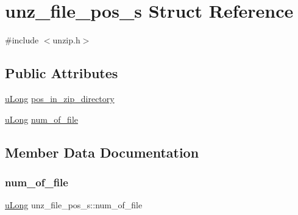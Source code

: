 \hypertarget{structunz__file__pos__s}{}\section{unz\+\_\+file\+\_\+pos\+\_\+s Struct Reference}
\label{structunz__file__pos__s}


{\ttfamily \#include $<$unzip.\+h$>$}

\subsection*{Public Attributes}
\begin{DoxyCompactItemize}
\item 
\hyperlink{ioapi_8h_a50e9e9d5c30e481de822ad68fe537986}{u\+Long} \hyperlink{structunz__file__pos__s_a87d193346d3825363f899f574a2f3cb2}{pos\+\_\+in\+\_\+zip\+\_\+directory}
\item 
\hyperlink{ioapi_8h_a50e9e9d5c30e481de822ad68fe537986}{u\+Long} \hyperlink{structunz__file__pos__s_a771dc0b7dba811b6174382f87f6800fc}{num\+\_\+of\+\_\+file}
\end{DoxyCompactItemize}


\subsection{Member Data Documentation}
\mbox{\label{structunz__file__pos__s_a771dc0b7dba811b6174382f87f6800fc}} 
\subsubsection{\texorpdfstring{num\+\_\+of\+\_\+file}{num\_of\_file}}
{\footnotesize\ttfamily \hyperlink{ioapi_8h_a50e9e9d5c30e481de822ad68fe537986}{u\+Long} unz\+\_\+file\+\_\+pos\+\_\+s\+::num\+\_\+of\+\_\+file}

\mbox{\label{structunz__file__pos__s_a87d193346d3825363f899f574a2f3cb2}} 
